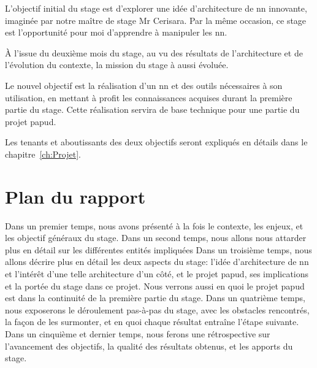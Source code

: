 L'objectif initial du stage est d'explorer une idée d'architecture de \gls{nn} innovante, imaginée par notre maître de stage Mr Cerisara.
Par la même occasion, ce stage est l'opportunité pour moi d'apprendre à manipuler les \gls{nn}.

À l'issue du deuxième mois du stage, au vu des résultats de l'architecture et de l'évolution du contexte, la mission du stage à aussi évoluée.

Le nouvel objectif est la réalisation d'un \gls{nn} et des outils nécessaires à son utilisation, en mettant à profit les connaissances acquises durant la première partie du stage.
Cette réalisation servira de base technique pour une partie du projet \gls{papud}.

Les tenants et aboutissants des deux objectifs seront expliqués en détails dans le chapitre~\ref{ch:Projet}.

\section[Plan]{Plan du rapport}

Dans un premier temps, nous avons présenté à la fois le contexte, les enjeux, et les objectif généraux du stage.
Dans un second temps, nous allons nous attarder plus en détail sur les différentes entités impliquées 
Dans un troisième temps, nous allons décrire plus en détail les deux aspects du stage: l'idée d'architecture de \gls{nn} et l'intérêt d'une telle architecture d'un côté, et le projet \gls{papud}, ses implications et la portée du stage dans ce projet. Nous verrons aussi en quoi le projet \gls{papud} est dans la continuité de la première partie du stage.
Dans un quatrième temps, nous exposerons le déroulement pas-à-pas du stage, avec les obstacles rencontrés, la façon de les surmonter, et en quoi chaque résultat entraîne l'étape suivante. 
Dans un cinquième et dernier temps, nous ferons une rétrospective sur l'avancement des objectifs, la qualité des résultats obtenus, et les apports du stage.






